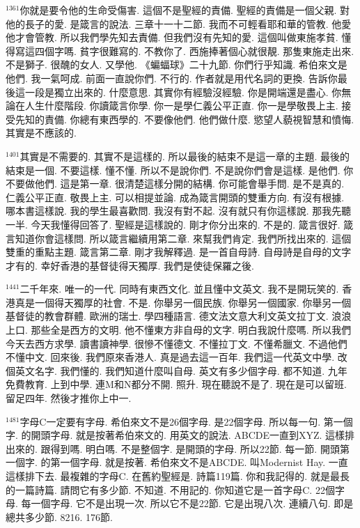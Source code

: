 \documentclass{book}
\begin{document}
$^{1361}$你就是要令他的生命受傷害.
這個不是聖經的責備.
聖經的責備是一個父親.
對他的長子的愛.
是箴言的說法.
三章十一十二節.
我而不可輕看耶和華的管教.
他愛他才會管教.
所以我們學先知去責備.
但我們沒有先知的愛.
這個叫做東施孝貧.
懂得寫這四個字嗎.
貧字很難寫的.
不教你了.
西施捧著個心就很靚.
那隻東施走出來.
不是獅子.
很醜的女人.
又學他.
《蝙蝠球》二十九節.
你們行乎知識.
希伯來文是他們.
我一氣呵成.
前面一直說你們.
不行的.
作者就是用代名詞的更換.
告訴你最後這一段是獨立出來的.
什麼意思.
其實你有經驗沒經驗.
你是開端還是盡心.
你無論在人生什麼階段.
你讀箴言你學.
你一是學仁義公平正直.
你一是學敬畏上主.
接受先知的責備.
你總有東西學的.
不要像他們.
他們做什麼.
慾望人藐視智慧和憤悔.
其實是不應該的.

$^{1401}$其實是不需要的.
其實不是這樣的.
所以最後的結束不是這一章的主題.
最後的結束是一個.
不要這樣.
懂不懂.
所以不是說你們.
不是說你們會是這樣.
是他們.
你不要做他們.
這是第一章.
很清楚這樣分開的結構.
你可能會舉手問.
是不是真的.
仁義公平正直.
敬畏上主.
可以相提並論.
成為箴言開頭的雙重方向.
有沒有根據.
哪本書這樣說.
我的學生最喜歡問.
我沒有對不起.
沒有就只有你這樣說.
那我先聽一半.
今天我懂得回答了.
聖經是這樣說的.
剛才你分出來的.
不是的.
箴言很好.
箴言知道你會這樣問.
所以箴言繼續用第二章.
來幫我們肯定.
我們所找出來的.
這個雙重的重點主題.
箴言第二章.
剛才我解釋過.
是一首自母詩.
自母詩是自母的文字才有的.
幸好香港的基督徒得天獨厚.
我們是使徒保羅之後.

$^{1441}$二千年來.
唯一的一代.
同時有東西文化.
並且懂中文英文.
我不是開玩笑的.
香港真是一個得天獨厚的社會.
不是.
你舉另一個民族.
你舉另一個國家.
你舉另一個基督徒的教會群體.
歐洲的瑞士.
學四種語言.
德文法文意大利文英文拉丁文.
浪浪上口.
那些全是西方的文明.
他不懂東方非自母的文字.
明白我說什麼嗎.
所以我們今天去西方求學.
讀書讀神學.
很慘不懂德文.
不懂拉丁文.
不懂希臘文.
不過他們不懂中文.
回來後.
我們原來香港人.
真是過去這一百年.
我們這一代英文中學.
改個英文名字.
我們懂的.
我們知道什麼叫自母.
英文有多少個字母.
都不知道.
九年免費教育.
上到中學.
連M和N都分不開.
照升.
現在聽說不是了.
現在是可以留班.
留足四年.
然後才推你上中一.

$^{1481}$字母C一定要有字母.
希伯來文不是26個字母.
是22個字母.
所以每一句.
第一個字.
的開頭字母.
就是按著希伯來文的.
用英文的說法.
ABCDE一直到XYZ.
這樣排出來的.
跟得到嗎.
明白嗎.
不是整個字.
是開頭的字母.
所以22節.
每一節.
開頭第一個字.
的第一個字母.
就是按著.
希伯來文不是ABCDE.
叫Modernist Hay.
一直這樣排下去.
最複雜的字母C.
在舊約聖經是.
詩篇119篇.
你和我記得的.
就是最長的一篇詩篇.
請問它有多少節.
不知道.
不用記的.
你知道它是一首字母C.
22個字母.
每一個字母.
它不是出現一次.
所以它不是22節.
它是出現八次.
連續八句.
即是總共多少節.
8216.
176節.
\end{document}
